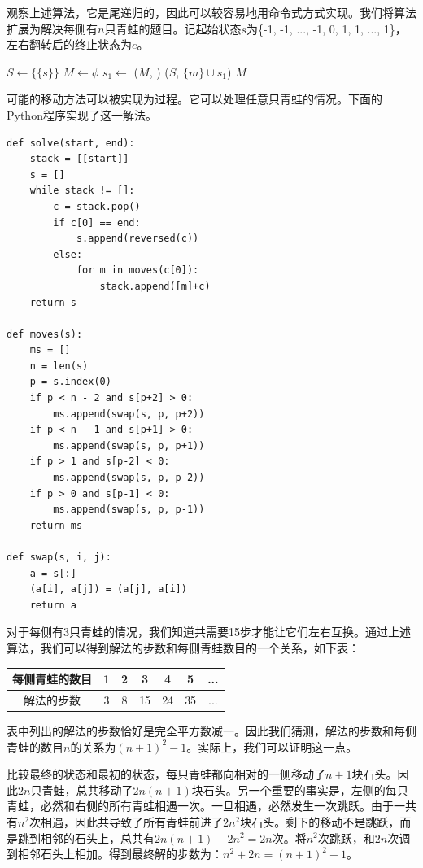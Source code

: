 \documentclass[UTF8]{article}
\begin{document}
观察上述算法，它是尾递归的，因此可以较容易地用命令式方式实现。我们将算法扩展为解决每侧有$n$只青蛙的题目。记起始状态$s$为\{-1, -1, ..., -1, 0, 1, 1, ..., 1\}，左右翻转后的终止状态为$e$。

\begin{algorithmic}[1]
  \State $S \gets \{\{s\}\}$
  \State $M \gets \phi$
    \State $s_1 \gets$ 
      \State {}($M$, )
    \Else
        \State {}($S$, $\{m\} \cup s_1$)
      \EndFor
    \EndIf
  \EndWhile
  \State \Return $M$
\EndFunction
\end{algorithmic}

可能的移动方法可以被实现为过程。它可以处理任意只青蛙的情况。下面的Python程序实现了这一解法。

\lstset{language=Python}
\begin{lstlisting}
def solve(start, end):
    stack = [[start]]
    s = []
    while stack != []:
        c = stack.pop()
        if c[0] == end:
            s.append(reversed(c))
        else:
            for m in moves(c[0]):
                stack.append([m]+c)
    return s

def moves(s):
    ms = []
    n = len(s)
    p = s.index(0)
    if p < n - 2 and s[p+2] > 0:
        ms.append(swap(s, p, p+2))
    if p < n - 1 and s[p+1] > 0:
        ms.append(swap(s, p, p+1))
    if p > 1 and s[p-2] < 0:
        ms.append(swap(s, p, p-2))
    if p > 0 and s[p-1] < 0:
        ms.append(swap(s, p, p-1))
    return ms

def swap(s, i, j):
    a = s[:]
    (a[i], a[j]) = (a[j], a[i])
    return a
\end{lstlisting}

对于每侧有3只青蛙的情况，我们知道共需要15步才能让它们左右互换。通过上述算法，我们可以得到解法的步数和每侧青蛙数目的一个关系，如下表：

\begin{tabular}{c|c|c|c|c|c|c}
每侧青蛙的数目 & 1 & 2 & 3  & 4  & 5 & ... \\
\hline
解法的步数 & 3 & 8 & 15 & 24 & 35 & ...
\end{tabular}

表中列出的解法的步数恰好是完全平方数减一。因此我们猜测，解法的步数和每侧青蛙的数目$n$的关系为$(n+1)^2 - 1$。实际上，我们可以证明这一点。

比较最终的状态和最初的状态，每只青蛙都向相对的一侧移动了$n+1$块石头。因此$2n$只青蛙，总共移动了$2n(n+1)$块石头。另一个重要的事实是，左侧的每只青蛙，必然和右侧的所有青蛙相遇一次。一旦相遇，必然发生一次跳跃。由于一共有$n^2$次相遇，因此共导致了所有青蛙前进了$2n^2$块石头。剩下的移动不是跳跃，而是跳到相邻的石头上，总共有$2n(n+1) - 2n^2 = 2n$次。将$n^2$次跳跃，和$2n$次调到相邻石头上相加。得到最终解的步数为：$n^2 + 2n = (n+1)^2 -1$。
\end{document}
